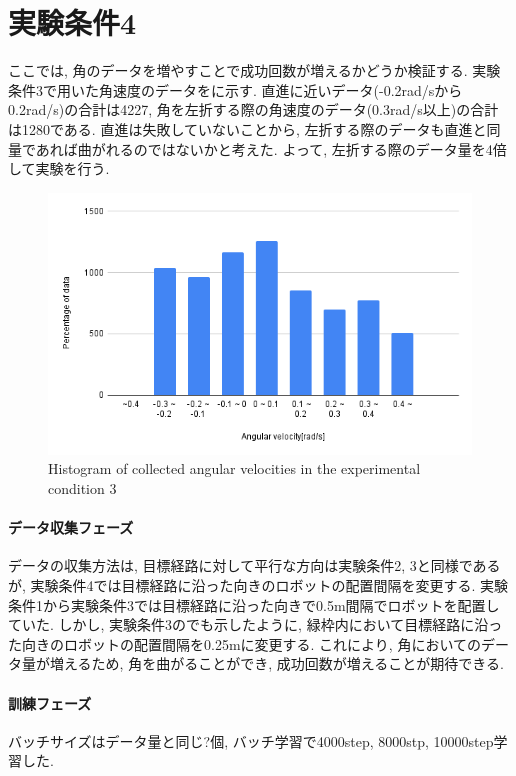 \section{実験条件4}
ここでは, 角のデータを増やすことで成功回数が増えるかどうか検証する. 実験条件3で用いた角速度のデータをに示す. 直進に近いデータ(-0.2rad/sから0.2rad/s)の合計は4227, 角を左折する際の角速度のデータ(0.3rad/s以上)の合計は1280である. 直進は失敗していないことから, 左折する際のデータも直進と同量であれば曲がれるのではないかと考えた. よって, 左折する際のデータ量を4倍して実験を行う. 

\begin{figure}[h]
  \centering
  \includegraphics[keepaspectratio, scale=0.4]{images/exp3.png}
  \caption{Histogram of collected angular velocities in the experimental condition 3}
  \label{Fig:exp3}
  \end{figure}

\paragraph{データ収集フェーズ}
データの収集方法は, 目標経路に対して平行な方向は実験条件2, 3と同様であるが, 実験条件4では目標経路に沿った向きのロボットの配置間隔を変更する. 実験条件1から実験条件3では目標経路に沿った向きで0.5m間隔でロボットを配置していた. しかし, 実験条件3のでも示したように, 緑枠内において目標経路に沿った向きのロボットの配置間隔を0.25mに変更する. これにより, 角においてのデータ量が増えるため, 角を曲がることができ, 成功回数が増えることが期待できる. 

\paragraph{訓練フェーズ}
バッチサイズはデータ量と同じ?個, バッチ学習で4000step, 8000stp, 10000step学習した. 

